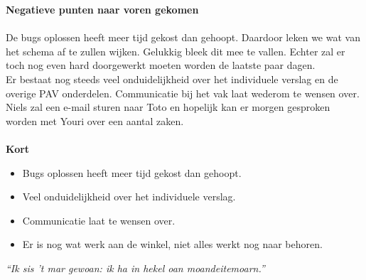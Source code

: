 \documentclass{uva-inf-article}
\begin{document}
\noindent
\textbf{Negatieve punten naar voren gekomen}\\\\
De bugs oplossen heeft meer tijd gekost dan gehoopt. Daardoor leken we wat van het schema af te zullen wijken. Gelukkig bleek dit mee te vallen. Echter zal er toch nog even hard doorgewerkt moeten worden de laatste paar dagen.\\
Er bestaat nog steeds veel onduidelijkheid over het individuele verslag en de overige PAV onderdelen. Communicatie bij het vak laat wederom te wensen over. Niels zal een e-mail sturen naar Toto en hopelijk kan er morgen gesproken worden met Youri over een aantal zaken.
\\\\

\noindent
\textbf{Kort}
\begin{itemize}
\item Bugs oplossen heeft meer tijd gekost dan gehoopt.
\item Veel onduidelijkheid over het individuele verslag.
\item Communicatie laat te wensen over.
\item Er is nog wat werk aan de winkel, niet alles werkt nog naar behoren.
\end{itemize}

								\vfill	\hfill	\textit{“Ik sis 't mar gewoan: ik ha in hekel oan moandeitemoarn.”}

\end{document}
